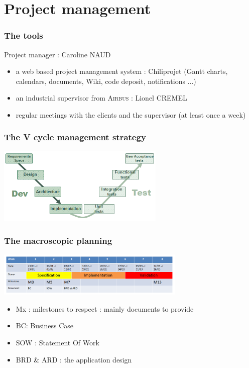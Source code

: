 \documentclass{beamer}
\begin{document}
\section{Project management}

\begin{frame}
	\frametitle{The tools}
Project manager : Caroline \textsc{NAUD}
	\begin{block}{}
    \begin{itemize}
		\item a web based project management system : Chiliprojet (Gantt charts, calendars, documents, Wiki, code deposit, notifications ...)
		\item an industrial supervisor from \textsc{Airbus} : Lionel \textsc{CREMEL}
		\item regular meetings with the clients and the supervisor (at least once a week)
	\end{itemize}
	\end{block}
\end{frame}

\begin{frame}
	\frametitle{The V cycle management strategy}
	\begin{center}
		\includegraphics[width=8cm]{VCycle}	
	\end{center}
    
\end{frame}

\begin{frame}
	\frametitle{The macroscopic planning}

    \begin{center}
		\includegraphics[width=9cm]{PlanningMacroscopique}	
	\end{center}
	
	\begin{block}{}
    \begin{itemize}
		\item Mx : milestones to respect : mainly documents to provide
		\item BC: Business Case
		\item SOW : Statement Of Work
		\item BRD \& ARD : the application design 
	\end{itemize}
	\end{block}
	
\end{frame}
\end{document}
